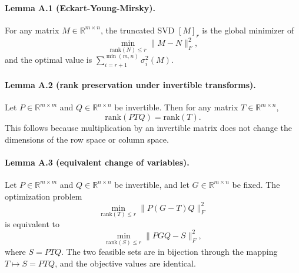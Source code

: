 \documentclass[a4paper,fleqn]{cas-dc}
\begin{document}
\paragraph{Lemma A.1 (Eckart-Young-Mirsky).}
For any matrix $M \in \mathbb{R}^{m\times n}$, the truncated SVD $[M]_r$ is the global minimizer of
\begin{equation}
\min_{\mathrm{rank}(N)\le r} \|M-N\|_F^2,
\end{equation}
and the optimal value is $\sum_{i=r+1}^{\min(m,n)} \sigma_i^2(M)$.

\paragraph{Lemma A.2 (rank preservation under invertible transforms).}
Let $P \in \mathbb{R}^{m\times m}$ and $Q \in \mathbb{R}^{n\times n}$ be invertible. Then for any matrix $T \in \mathbb{R}^{m\times n}$,
\begin{equation}
\mathrm{rank}(PTQ)=\mathrm{rank}(T).
\end{equation}
This follows because multiplication by an invertible matrix does not change the dimensions of the row space or column space.

\paragraph{Lemma A.3 (equivalent change of variables).}
Let $P \in \mathbb{R}^{m\times m}$ and $Q \in \mathbb{R}^{n\times n}$ be invertible, and let $G \in \mathbb{R}^{m\times n}$ be fixed. The optimization problem
\begin{equation}
\min_{\mathrm{rank}(T)\le r} \|P(G-T)Q\|_F^2
\end{equation}
is equivalent to
\begin{equation}
\min_{\mathrm{rank}(S)\le r} \|PGQ-S\|_F^2,
\end{equation}
where $S=PTQ$. The two feasible sets are in bijection through the mapping $T \mapsto S=PTQ$, and the objective values are identical.
\end{document}
